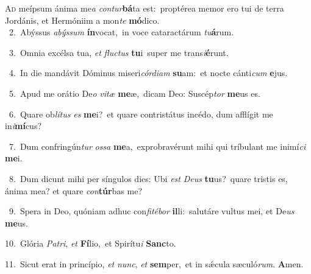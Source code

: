 \lettrine{\initial\textcolor{\initialcolor}{A}}{d} meípsum ánima me\textit{a} \textit{con}\-\textit{tur}\textbf{bá}ta est:~\star proptérea memor ero tui de terra Jordánis, et Hermóniim a mon\textit{te} \textbf{mó}\-dico.\\
{\numbfont\textcolor{\numbcolor}{~2.}}~Abýssus \textit{a}\-\textit{býs}\textit{sum} \textbf{ín}\-vocat,~\star in voce cataractárum \textit{tu}\-\textbf{á}rum.\par
{\numbfont\textcolor{\numbcolor}{~3.}}~Omnia excélsa tua, \textit{et} \textit{fluc}\-\textit{tus} \textbf{tu}\-i~\star super me trans\-\textit{i}\-\textbf{é}runt.\par
{\numbfont\textcolor{\numbcolor}{~4.}}~In die mandávit Dóminus miseri\-\textit{cór}\-\textit{di}\textit{am} \textbf{su}\-am:~\star et nocte cánti\textit{cum} \textbf{e}\-jus.\par
{\numbfont\textcolor{\numbcolor}{~5.}}~Apud me orátio De\textit{o} \textit{vi}\-\textit{tæ} \textbf{me}\-æ,~\star dicam Deo: Suscép\textit{tor} \textbf{me}\-us es.\par
{\numbfont\textcolor{\numbcolor}{~6.}}~Quare ob\-\textit{lí}\-\textit{tus} \textit{es} \textbf{me}\-i?~\star et quare contristátus incédo, dum afflígit me in\-\textit{i}\-\textbf{mí}cus?\par
{\numbfont\textcolor{\numbcolor}{~7.}}~Dum confringún\textit{tur} \textit{os}\-\textit{sa} \textbf{me}\-a,~\star exprobravérunt mihi qui tríbulant me inimí\textit{ci} \textbf{me}\-i.\par
{\numbfont\textcolor{\numbcolor}{~8.}}~Dum dicunt mihi per síngulos dies: Ubi \textit{est} \textit{De}\-\textit{us} \textbf{tu}\-us?~\star quare tristis es, ánima mea? et quare \textit{con}\-\textbf{túr}bas me?\par
{\numbfont\textcolor{\numbcolor}{~9.}}~Spera in Deo, quóniam adhuc con\-\textit{fi}\-\textit{té}\textit{bor} \textbf{il}\-li:~\star salutáre vultus mei, et De\textit{us} \textbf{me}\-us.\par
{\numbfont\textcolor{\numbcolor}{10.}}~Glória \textit{Pa}\-\textit{tri}, \textit{et} \textbf{Fí}\-lio,~\star et Spirítu\textit{i} \textbf{Sanc}\-to.\par
{\numbfont\textcolor{\numbcolor}{11.}}~Sicut erat in princípio, \textit{et} \textit{nunc}\-, \textit{et} \textbf{sem}\-per,~\star et in sǽcula sæculó\-\textit{rum}\-. \textbf{A}\-men.\par
